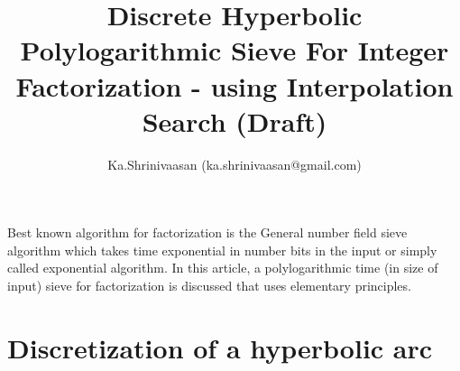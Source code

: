 \documentclass[11pt,onecolumn]{article}
\author{ Ka.Shrinivaasan (ka.shrinivaasan@gmail.com) }
\title{Discrete Hyperbolic Polylogarithmic Sieve For Integer Factorization - using Interpolation Search (Draft)}
\begin{document}
\thispagestyle{empty}
\pagestyle{empty}
\maketitle
\begin{onecolabstract}
Best known algorithm for factorization is the General number field sieve algorithm which takes time
exponential in number bits in the input or simply called exponential algorithm. In this article, a polylogarithmic time (in size of input) sieve for factorization is discussed that uses elementary principles.
\end{onecolabstract}

\section{Discretization of a hyperbolic arc}
\end{document}

